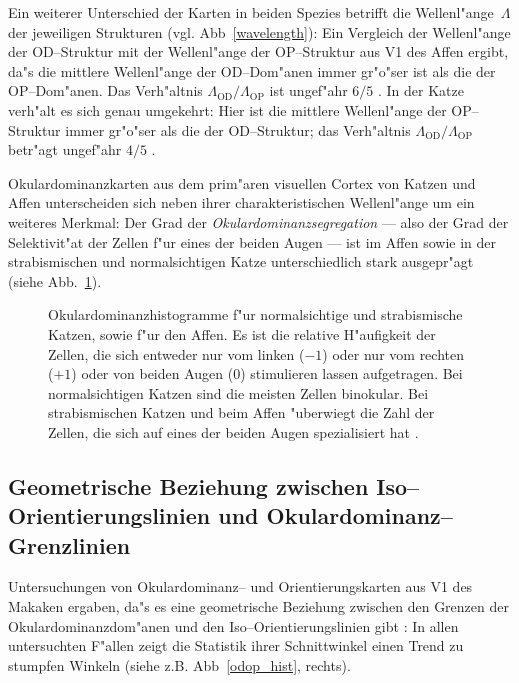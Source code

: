 Ein weiterer Unterschied der Karten in beiden Spezies betrifft die
Wellenl"ange~$\Lambda$ der jeweiligen Strukturen
(vgl. Abb~\ref{wavelength}): Ein Vergleich der Wellenl"ange der
OD--Struktur mit der Wellenl"ange der OP--Struktur aus V1 des Affen ergibt,
da"s die mittlere Wellenl"ange der OD--Dom"anen immer gr"o"ser ist als die
der OP--Dom"anen.  Das Verh"altnis
$\Lambda_{\text{OD}}/\Lambda_{\text{OP}}$ ist ungef"ahr $6/5$
\cite{oby:1993b}. In der Katze verh"alt es sich genau umgekehrt: Hier ist
die mittlere Wellenl"ange der OP--Struktur immer gr"o"ser als die der
OD--Struktur; das Verh"altnis $\Lambda_{\text{OD}}/\Lambda_{\text{OP}}$
betr"agt ungef"ahr $4/5$ \cite{loewel:1988}.

Okulardominanzkarten aus dem prim"aren visuellen Cortex von Katzen und
Affen unterscheiden sich neben ihrer charakteristischen Wellenl"ange um ein
weiteres Merkmal: Der Grad der \emph{Okulardominanzsegregation} --- also
der Grad der Selektivit"at der Zellen f"ur eines der beiden Augen --- ist
im Affen sowie in der strabismischen und normalsichtigen Katze
unterschiedlich stark ausgepr"agt (siehe Abb.~\ref{okuhist}).

\begin{figure}[t]
\begin{center}
\end{center}
\caption{Okulardominanzhistogramme f"ur normalsichtige und strabismische
Katzen, sowie f"ur den Affen. Es ist die relative H"aufigkeit der Zellen,
die sich entweder nur vom linken ($-1$) oder nur vom rechten ($+1$) oder
von beiden Augen ($0$) stimulieren lassen aufgetragen. Bei normalsichtigen
Katzen sind die meisten Zellen binokular. Bei strabismischen Katzen und
beim Affen "uberwiegt die Zahl der Zellen, die sich auf eines der beiden
Augen spezialisiert hat \protect{}.}
\label{okuhist}
\end{figure}

\subsection[Geometrische Beziehung zwischen
Iso--Orientierungslinien$\ldots$]{Geometrische Beziehung zwischen
Iso--Orientierungslinien und Okulardominanz--Grenzlinien}
\label{90grad}

Untersuchungen von Okulardominanz-- und Orientierungskarten aus V1 des
Makaken ergaben, da"s es eine geometrische Beziehung zwischen den Grenzen
der Okulardominanzdom"anen und den Iso--Orientierungslinien gibt
\cite{bartfield:1992,oby:1993b}: In allen untersuchten F"allen zeigt die
Statistik ihrer Schnittwinkel einen Trend zu stumpfen Winkeln (siehe
z.B. Abb~\ref{odop_hist}, rechts).

